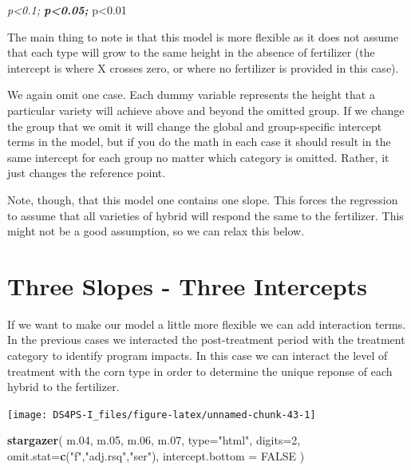 \documentclass[]{book}
\newenvironment{Shaded}{\begin{snugshade}}{\end{snugshade}}
\newcommand{\DataTypeTok}[1]{\textcolor[rgb]{0.13,0.29,0.53}{#1}}
\newcommand{\DecValTok}[1]{\textcolor[rgb]{0.00,0.00,0.81}{#1}}
\newcommand{\FloatTok}[1]{\textcolor[rgb]{0.00,0.00,0.81}{#1}}
\newcommand{\KeywordTok}[1]{\textcolor[rgb]{0.13,0.29,0.53}{\textbf{#1}}}
\newcommand{\NormalTok}[1]{#1}
\newcommand{\OtherTok}[1]{\textcolor[rgb]{0.56,0.35,0.01}{#1}}
\newcommand{\StringTok}[1]{\textcolor[rgb]{0.31,0.60,0.02}{#1}}
\theoremstyle{definition}
\theoremstyle{definition}
\theoremstyle{definition}
\theoremstyle{remark}
\begin{document}
\emph{p\textless{}0.1; \textbf{p\textless{}0.05; }}p\textless{}0.01

The main thing to note is that this model is more flexible as it does
not assume that each type will grow to the same height in the absence of
fertilizer (the intercept is where X crosses zero, or where no
fertilizer is provided in this case).

We again omit one case. Each dummy variable represents the height that a
particular variety will achieve above and beyond the omitted group. If
we change the group that we omit it will change the global and
group-specific intercept terms in the model, but if you do the math in
each case it should result in the same intercept for each group no
matter which category is omitted. Rather, it just changes the reference
point.

Note, though, that this model one contains one slope. This forces the
regression to assume that all varieties of hybrid will respond the same
to the fertilizer. This might not be a good assumption, so we can relax
this below.

\hypertarget{three-slopes---three-intercepts}{%
\section{Three Slopes - Three
Intercepts}\label{three-slopes---three-intercepts}}

If we want to make our model a little more flexible we can add
interaction terms. In the previous cases we interacted the
post-treatment period with the treatment category to identify program
impacts. In this case we can interact the level of treatment with the
corn type in order to determine the unique reponse of each hybrid to the
fertilizer.

\begin{center}\texttt{[image: DS4PS-I\_files/figure-latex/unnamed-chunk-43-1]} \end{center}

\begin{Shaded}
\begin{Highlighting}[]

\KeywordTok{stargazer}\NormalTok{( m}\FloatTok{.04}\NormalTok{, m}\FloatTok{.05}\NormalTok{, m}\FloatTok{.06}\NormalTok{, m}\FloatTok{.07}\NormalTok{, }\DataTypeTok{type=}\StringTok{"html"}\NormalTok{, }
           \DataTypeTok{digits=}\DecValTok{2}\NormalTok{, }
           \DataTypeTok{omit.stat=}\KeywordTok{c}\NormalTok{(}\StringTok{"f"}\NormalTok{,}\StringTok{"adj.rsq"}\NormalTok{,}\StringTok{"ser"}\NormalTok{),}
           \DataTypeTok{intercept.bottom =} \OtherTok{FALSE}\NormalTok{ )        }
\end{Highlighting}
\end{Shaded}
\end{document}

